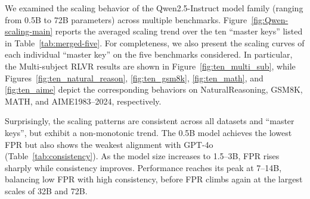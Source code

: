 We examined the scaling behavior of the Qwen2.5-Instruct model family (ranging from 0.5B to 72B parameters) across multiple benchmarks. Figure~\ref{fig:Qwen-scaling-main} reports the averaged scaling trend over the ten “master keys” listed in Table~\ref{tab:merged-five}. For completeness, we also present the scaling curves of each individual “master key” on the five benchmarks considered. In particular, the Multi-subject RLVR results are shown in Figure~\ref{fig:ten_multi_sub}, while Figures~\ref{fig:ten_natural_reason}, \ref{fig:ten_gsm8k}, \ref{fig:ten_math}, and \ref{fig:ten_aime} depict the corresponding behaviors on NaturalReasoning, GSM8K, MATH, and AIME1983–2024, respectively.

Surprisingly, the scaling patterns are consistent across all datasets and ``master keys'', but exhibit a non-monotonic trend. The 0.5B model achieves the lowest FPR but also shows the weakest alignment with GPT-4o (Table~\ref{tab:consistency}). As the model size increases to 1.5–3B, FPR rises sharply while consistency improves. Performance reaches its peak at 7–14B, balancing low FPR with high consistency, before FPR climbs again at the largest scales of 32B and 72B.





